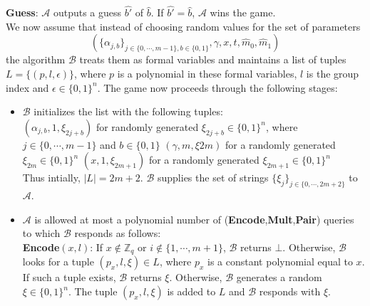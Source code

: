  
\noindent\textbf{Guess}: $\mathcal{A}$ outputs a guess $\hat{b'}$ of $\hat{b}$. If $\hat{b'} = \hat{b}$, $\mathcal{A}$ wins the game.\\

\noindent We now assume that instead of choosing random values for the set of parameters 
\begin{equation}
 (\{\alpha_{j,b}\}_{j\in\{0,\cdots,m-1\},b\in\{0,1\}},\gamma,x,t,\hat{m}_0,\hat{m}_1)\nonumber
\end{equation}
\noindent the algorithm $\mathcal{B}$ treats them as formal variables and maintains a list of tuples $L=\{(p,l,\epsilon)\}$, where $p$ is a polynomial in these formal variables, $l$ is the group index and $\epsilon\in\{0,1\}^{n}$. The game now proceeds through the following stages:

\begin{itemize}
\item $\mathcal{B}$ initializes the list with the following tuples:\\
 \subitem $(\alpha_{j,b},1,\xi_{2j+b})$ for randomly generated $\xi_{2j+b}\in\{0,1\}^{n}$, where $j\in\{0,\cdots,m-1\}$ and $b\in\{0,1\}$
 \subitem $(\gamma,m,\xi{2m})$ for a randomly generated $\xi_{2m}\in\{0,1\}^{n}$
 \subitem $(x,1,\xi_{2m+1})$ for a randomly generated $\xi_{2m+1}\in\{0,1\}^{n}$\\

\noindent Thus intially, $|L|=2m+2$. $\mathcal{B}$ supplies the set of strings $\{\xi_j\}_{j\in\{0,\cdots,2m+2\}}$ to $\mathcal{A}$.\\ 


\item $\mathcal{A}$ is allowed at most a polynomial number of (\textbf{Encode},\textbf{Mult},\textbf{Pair}) queries to which $\mathcal{B}$ responds as follows:\\

\subitem \textbf{Encode}$(x,l)$: If $x\notin \mathbb{Z}_q$ or $i\notin\{1,\cdots,m+1\}$, $\mathcal{B}$ returns $\bot$. Otherwise, $\mathcal{B}$ looks for a tuple $(p_x,l,\xi)\in L$, where $p_x$ is a constant polynomial equal to $x$. If such a tuple exists, $\mathcal{B}$ returns $\xi$. Otherwise, $\mathcal{B}$ generates a random $\xi\in\{0,1\}^{n}$. The tuple $(p_x,l,\xi)$ is added to $L$ and $\mathcal{B}$ responds with $\xi$.\\


\end{itemize}
